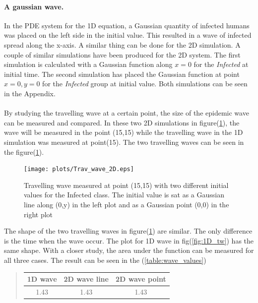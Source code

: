 \documentclass[%
twoside,                 %
final,                   %
10pt]{article}
\begin{document}
\paragraph{A gaussian wave.}
In the PDE system for the 1D equation, a Gaussian quantity of infected humans was placed on the left side in the initial value. This resulted in a wave of infected spread along the x-axis. A similar thing can be done for the 2D simulation. A couple of similar simulations have been produced for the 2D system. The first simulation is calculated with a Gaussian function along $x=0$ for the \emph{Infected} at initial time. The second simulation has placed the Gaussian function at point $x=0,y=0$ for the \emph{Infected} group at initial value. Both simulations can be seen in the Appendix.  
\\
\\
By studying the travelling wave at a certain point, the size of the epidemic wave can be measured and compared. In these two 2D simulations in figure(\ref{fig:2D_trav_wave}), the wave will be measured in the point (15,15) while the travelling wave in the 1D simulation was measured at point(15). The two travelling waves can be seen in the figure(\ref{fig:2D_trav_wave}).


\begin{figure}[ht]
  \centerline{\texttt{[image: plots/Trav\_wave\_2D.eps]}}
  \caption{
  \label{fig:2D_trav_wave} Travelling wave measured at point (15,15) with two different initial values for the Infected class. The initial value is sat as a Gaussian line along (0,y) in the left plot and as a Gaussian point (0,0) in the right plot
  }
\end{figure}


The shape of the two travelling waves in figure(\ref{fig:2D_trav_wave}) are similar. The only difference is the time when the wave occur. The plot for 1D wave in fig(\ref{fig:1D_tw}) has the same shape. With a closer study, the area under the function can be measured for all three cases. The result can be seen in the (\ref{table:wave_values})   


\label{table:wave_values}

\begin{quote}
\begin{tabular}{ccc}
\hline
\multicolumn{1}{c}{ 1D wave } & \multicolumn{1}{c}{ 2D wave line } & \multicolumn{1}{c}{ 2D wave point } \\
\hline
1.43          & 1.43          & 1.43          \\
\hline
\end{tabular}
\end{quote}
\end{document}
